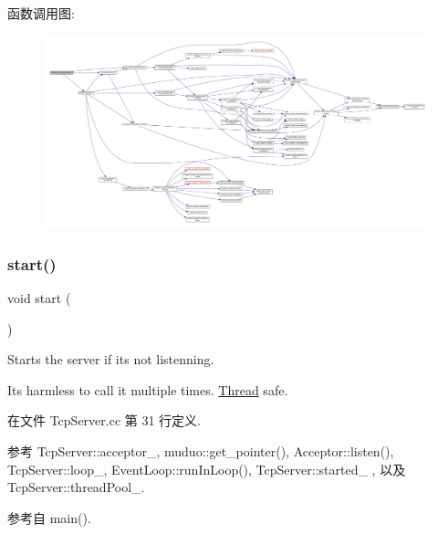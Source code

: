 函数调用图\+:
\nopagebreak
\begin{figure}[H]
\begin{center}
\leavevmode
\includegraphics[width=350pt]{classmuduo_1_1TcpServer_a94b31be320453fc8aeae81b25934b43f_cgraph}
\end{center}
\end{figure}
\mbox{\label{classmuduo_1_1TcpServer_a60de64d75454385b23995437f1d72669}} 
\subsubsection{\texorpdfstring{start()}{start()}}
{\footnotesize\ttfamily void start (\begin{DoxyParamCaption}{ }\end{DoxyParamCaption})}

Starts the server if it\textquotesingle{}s not listenning.

It\textquotesingle{}s harmless to call it multiple times. \hyperlink{classmuduo_1_1Thread}{Thread} safe. 

在文件 Tcp\+Server.\+cc 第 31 行定义.



参考 Tcp\+Server\+::acceptor\+\_\+, muduo\+::get\+\_\+pointer(), Acceptor\+::listen(), Tcp\+Server\+::loop\+\_\+, Event\+Loop\+::run\+In\+Loop(), Tcp\+Server\+::started\+\_\+ , 以及 Tcp\+Server\+::thread\+Pool\+\_\+.



参考自 main().

